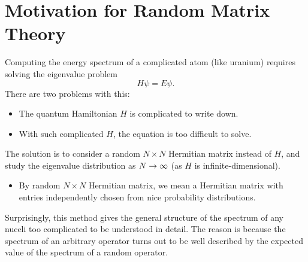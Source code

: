 \section{Motivation for Random Matrix Theory}
Computing the energy spectrum of a complicated atom (like uranium) requires solving the eigenvalue problem
\[
    H\psi = E\psi.
\]
There are two problems with this:
\begin{itemize}
    \item The quantum Hamiltonian $H$ is complicated to write down.
    \item With such complicated $H$, the equation is too difficult to solve.
\end{itemize}

The solution is to consider a random $N \times N$ Hermitian matrix instead of $H$, and study the eigenvalue distribution as $N \to \infty$ (as $H$ is infinite-dimensional).
\begin{itemize}
    \item By random $N \times N$ Hermitian matrix, we mean a Hermitian matrix with entries independently chosen from nice probability distributions.
\end{itemize}
Surprisingly, this method gives the general structure of the spectrum of any nuceli too complicated to be understood in detail. The reason is because the spectrum of an arbitrary operator turns out to be well described by the expected value of the spectrum of a random operator.